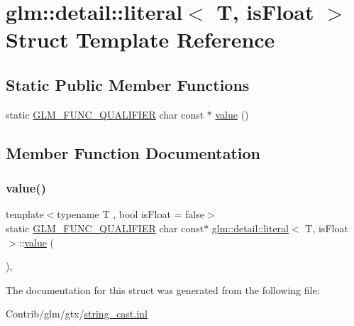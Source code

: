 \hypertarget{structglm_1_1detail_1_1literal}{}\section{glm\+:\+:detail\+:\+:literal$<$ T, is\+Float $>$ Struct Template Reference}
\label{structglm_1_1detail_1_1literal}
\subsection*{Static Public Member Functions}
\begin{DoxyCompactItemize}
\item 
static \mbox{\hyperlink{setup_8hpp_a33fdea6f91c5f834105f7415e2a64407}{G\+L\+M\+\_\+\+F\+U\+N\+C\+\_\+\+Q\+U\+A\+L\+I\+F\+I\+ER}} char const  $\ast$ \mbox{\hyperlink{structglm_1_1detail_1_1literal_a14fd9d6fec8d35f7a2fd3b0095d17b6a}{value}} ()
\end{DoxyCompactItemize}


\subsection{Member Function Documentation}
\mbox{\label{structglm_1_1detail_1_1literal_a14fd9d6fec8d35f7a2fd3b0095d17b6a}} 
\subsubsection{\texorpdfstring{value()}{value()}}
{\footnotesize\ttfamily template$<$typename T , bool is\+Float = false$>$ \\
static \mbox{\hyperlink{setup_8hpp_a33fdea6f91c5f834105f7415e2a64407}{G\+L\+M\+\_\+\+F\+U\+N\+C\+\_\+\+Q\+U\+A\+L\+I\+F\+I\+ER}} char const$\ast$ \mbox{\hyperlink{structglm_1_1detail_1_1literal}{glm\+::detail\+::literal}}$<$ T, is\+Float $>$\+::\mbox{\hyperlink{_s_d_l__opengl__glext_8h_a8ad81492d410ff2ac11f754f4042150f}{value}} (\begin{DoxyParamCaption}{ }\end{DoxyParamCaption})\hspace{0.3cm}{\ttfamily [inline]}, {\ttfamily [static]}}



The documentation for this struct was generated from the following file\+:\begin{DoxyCompactItemize}
\item 
Contrib/glm/gtx/\mbox{\hyperlink{string__cast_8inl}{string\+\_\+cast.\+inl}}\end{DoxyCompactItemize}
